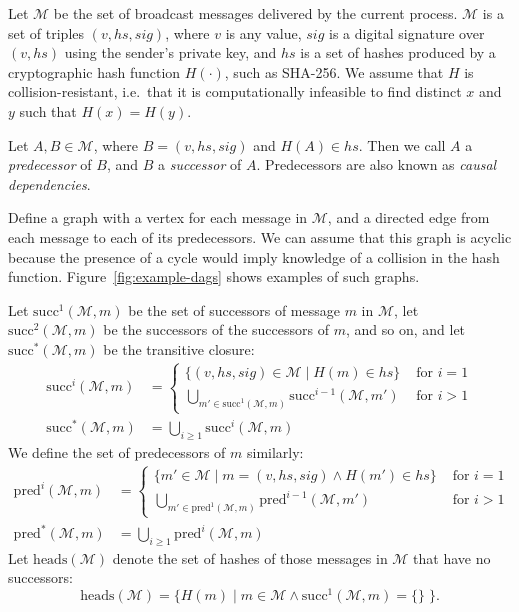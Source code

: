 \documentclass[a4paper,anonymous,USenglish]{lipics-v2019}
\begin{document}
Let $\mathcal{M}$ be the set of broadcast messages delivered by the current process.
$\mathcal{M}$ is a set of triples $(v, \mathit{hs}, \mathit{sig})$, where $v$ is any value, $\mathit{sig}$ is a digital signature over $(v, \mathit{hs})$ using the sender's private key, and $\mathit{hs}$ is a set of hashes produced by a cryptographic hash function $H(\cdot)$, such as SHA-256.
We assume that $H$ is collision-resistant, i.e.\ that it is computationally infeasible to find distinct $x$ and $y$ such that $H(x) = H(y)$.

Let $A, B \in \mathcal{M}$, where $B = (v, \mathit{hs}, \mathit{sig})$ and $H(A) \in \mathit{hs}$.
Then we call $A$ a \emph{predecessor} of $B$, and $B$ a \emph{successor} of $A$.
Predecessors are also known as \emph{causal dependencies}.

Define a graph with a vertex for each message in $\mathcal{M}$, and a directed edge from each message to each of its predecessors.
We can assume that this graph is acyclic because the presence of a cycle would imply knowledge of a collision in the hash function.
Figure~\ref{fig:example-dags} shows examples of such graphs.

Let $\mathrm{succ}^1(\mathcal{M}, m)$ be the set of successors of message $m$ in $\mathcal{M}$, let $\mathrm{succ}^2(\mathcal{M}, m)$ be the successors of the successors of $m$, and so on, and let $\mathrm{succ}^*(\mathcal{M}, m)$ be the transitive closure:
\begin{align*}
\mathrm{succ}^i(\mathcal{M}, m) &=
\begin{cases}
\{(v, \mathit{hs}, \mathit{sig}) \in \mathcal{M} \mid H(m) \in \mathit{hs}\} & \text{ for } i=1 \\
\bigcup_{m' \in \mathrm{succ}^1(\mathcal{M}, m)} \mathrm{succ}^{i-1}(\mathcal{M}, m') & \text{ for } i>1
\end{cases} \\
\mathrm{succ}^*(\mathcal{M}, m) &= \bigcup_{i \ge 1} \mathrm{succ}^i(\mathcal{M}, m)
\end{align*}
We define the set of predecessors of $m$ similarly:
\begin{align*}
\mathrm{pred}^i(\mathcal{M}, m) &=
\begin{cases}
\{ m' \in \mathcal{M} \mid m = (v, \mathit{hs}, \mathit{sig}) \wedge H(m') \in \mathit{hs}\} & \text{ for } i=1 \\
\bigcup_{m' \in \mathrm{pred}^1(\mathcal{M}, m)} \mathrm{pred}^{i-1}(\mathcal{M}, m') & \text{ for } i>1
\end{cases} \\
\mathrm{pred}^*(\mathcal{M}, m) &= \bigcup_{i \ge 1} \mathrm{pred}^i(\mathcal{M}, m)
\end{align*}
Let $\mathrm{heads}(\mathcal{M})$ denote the set of hashes of those messages in $\mathcal{M}$ that have no successors:
\[ \mathrm{heads}(\mathcal{M}) = \{H(m) \mid m \in \mathcal{M} \wedge \mathrm{succ}^1(\mathcal{M}, m) = \{\}\;\}. \]
\end{document}
